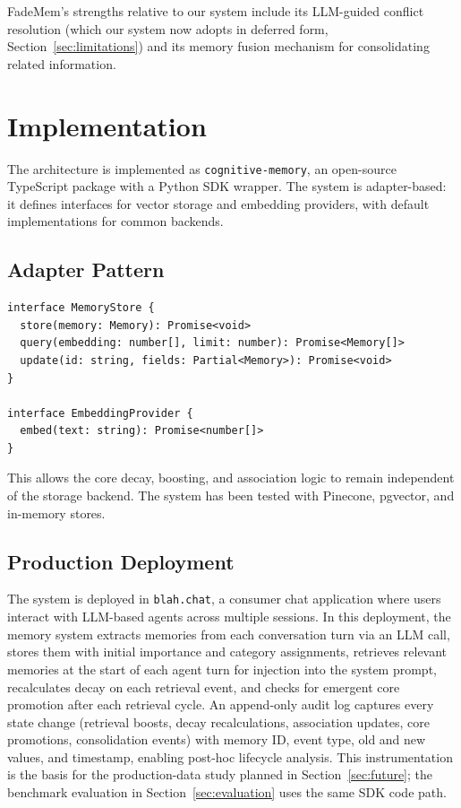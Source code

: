 \documentclass[11pt,a4paper]{article}
\begin{document}
FadeMem's strengths relative to our system include its LLM-guided conflict resolution (which our system now adopts in deferred form, Section~\ref{sec:limitations}) and its memory fusion mechanism for consolidating related information.

\section{Implementation}

The architecture is implemented as \texttt{cognitive-memory}, an open-source TypeScript package with a Python SDK wrapper. The system is adapter-based: it defines interfaces for vector storage and embedding providers, with default implementations for common backends.

\subsection{Adapter Pattern}

\begin{verbatim}
interface MemoryStore {
  store(memory: Memory): Promise<void>
  query(embedding: number[], limit: number): Promise<Memory[]>
  update(id: string, fields: Partial<Memory>): Promise<void>
}

interface EmbeddingProvider {
  embed(text: string): Promise<number[]>
}
\end{verbatim}

This allows the core decay, boosting, and association logic to remain independent of the storage backend. The system has been tested with Pinecone, pgvector, and in-memory stores.

\subsection{Production Deployment}

The system is deployed in \texttt{blah.chat}, a consumer chat application where users interact with LLM-based agents across multiple sessions. In this deployment, the memory system extracts memories from each conversation turn via an LLM call, stores them with initial importance and category assignments, retrieves relevant memories at the start of each agent turn for injection into the system prompt, recalculates decay on each retrieval event, and checks for emergent core promotion after each retrieval cycle. An append-only audit log captures every state change (retrieval boosts, decay recalculations, association updates, core promotions, consolidation events) with memory ID, event type, old and new values, and timestamp, enabling post-hoc lifecycle analysis. This instrumentation is the basis for the production-data study planned in Section~\ref{sec:future}; the benchmark evaluation in Section~\ref{sec:evaluation} uses the same SDK code path.
\end{document}
